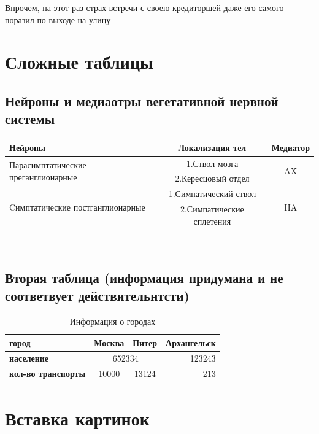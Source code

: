 \documentclass[10pt,a4paper]{report}
\begin{document}
Впрочем, на этот раз страх встречи с своею кредиторшей даже его самого поразил по выходе на улицу\cite{dostoyevsky2017crime}
\clearpage
\chapter{Сложные таблицы}
\section{Нейроны и медиаотры вегетативной нервной системы}

\begin{tabular}{ l | c | c }
\hline
  Нейроны & Локализация тел & Медиатор \\
  \hline
  \hline
  \multirow{2}{10em}{Парасимптатические преганглионарные} & 1.Ствол мозга & \multirow{2}{10em}{AX} \\
  & 2.Кересцовый отдел &\\
  \hline
  \multirow{2}{10em}{Cимптатические постганглионарные} & 1.Симпатический ствол & \multirow{2}{10em}{HA} \\
  & 2.Симпатические сплетения & \\
    \hline
\end{tabular} \\

\section{Вторая таблица (информация придумана и не соответвует действительнтсти)}
\begin{table}[h!]
    \begin{center}
    \caption{Информация о городах}
    \label{tab:table1}
    \begin{tabular}{l|c|c|r}
        \hline
        \textbf{город} & \textbf{Москва} & \textbf{Питер} & \textbf{Архангельск}\\
        \hline
        \hline
        \textbf{население} & \multicolumn{2}{c|}{652334} & 123243\\ 
        \hline
        \textbf{кол-во транспорты} & 10000 & 13124 & 213
    \end{tabular}
  \end{center}
\end{table}



\chapter{Вставка картинок}
\end{document}
